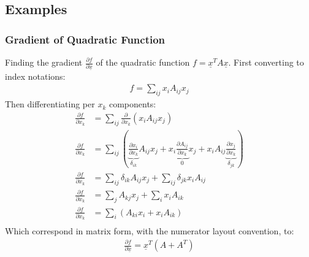 


\newpage

\subsection{Examples}

\subsubsection{Gradient of Quadratic Function}

Finding the gradient $\frac{\partial f}{\partial \underline{x}}$ of the quadratic function $f=\underline{x}^T A \underline{x}$. First converting to index notations:
\begin{align}
f = \sum_{ij}{x_i A_{ij} x_j}
\end{align}
Then differentiating per $x_k$ components:
\begin{align}
\frac{\partial f}{\partial x_k} &= \sum_{ij}{  \frac{\partial}{\partial x_k} \left(x_i A_{ij} x_j \right)} \\
\frac{\partial f}{\partial x_k} &= \sum_{ij}{\left( \underbrace{ \frac{\partial x_i}{\partial x_k}}_{\delta_{ik}}  A_{ij} x_j + x_i \underbrace{\frac{\partial A_{ij} }{\partial x_k}}_{0} x_j + x_i A_{ij} \underbrace{\frac{\partial x_j}{\partial x_k}}_{\delta_{jk}} \right)} \\
\frac{\partial f}{\partial x_k} &= \sum_{ij}{  \delta_{ik}  A_{ij} x_j } + \sum_{ij}{  \delta_{jk} x_i A_{ij} }\\
\frac{\partial f}{\partial x_k} &= \sum_{j}{  A_{kj} x_j } + \sum_{i}{ x_i A_{ik} }\\
\frac{\partial f}{\partial x_k} &= \sum_{i}{\left(  A_{ki} x_i  + x_i A_{ik} \right)}\\
\end{align}
Which correspond in matrix form, with the numerator layout convention, to:
\begin{align}
\frac{\partial f}{\partial \underline{x}} = \underline{x}^T ( A + A^T )
\end{align}


